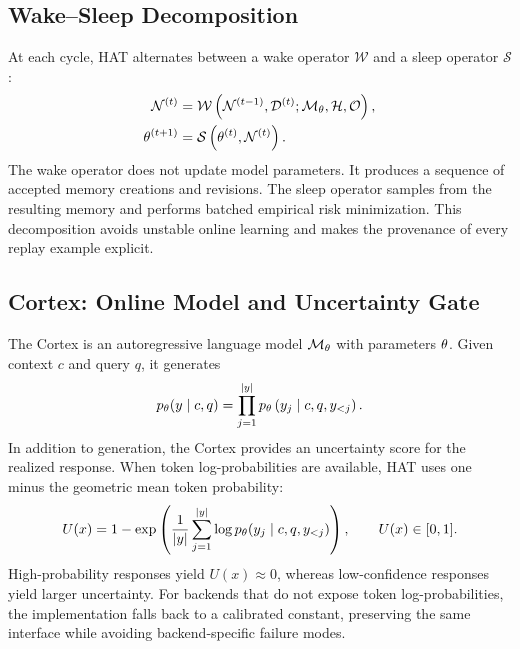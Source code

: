 \subsection{Wake--Sleep Decomposition}
\label{sec:method:wake_sleep}

At each cycle, HAT alternates between a wake operator $\mathcal{W}$ and a sleep operator $\mathcal{S}$:
\begin{align}
  \mathcal{N}^{(t)}
  &=
  \mathcal{W}
  \left(
    \mathcal{N}^{(t-1)}, \mathcal{D}^{(t)}; \mathcal{M}_{\theta}, \mathcal{H}, \mathcal{O}
  \right),
  \label{eq:wake_operator} \\
  \theta^{(t+1)}
  &=
  \mathcal{S}
  \left(
    \theta^{(t)}, \mathcal{N}^{(t)}
  \right).
  \label{eq:sleep_operator}
\end{align}
The wake operator does not update model parameters.
It produces a sequence of accepted memory creations and revisions.
The sleep operator samples from the resulting memory and performs batched empirical risk minimization.
This decomposition avoids unstable online learning and makes the provenance of every replay example explicit.

\subsection{Cortex: Online Model and Uncertainty Gate}
\label{sec:method:cortex}

The Cortex is an autoregressive language model $\mathcal{M}_{\theta}$ with parameters $\theta$.
Given context $c$ and query $q$, it generates
\begin{equation}
  p_{\theta}(y \mid c,q)
  =
  \prod_{j=1}^{|y|}
  p_{\theta}
  \left(y_j \mid c,q,y_{<j}\right).
  \label{eq:cortex_lm}
\end{equation}
In addition to generation, the Cortex provides an uncertainty score for the realized response.
When token log-probabilities are available, HAT uses one minus the geometric mean token probability:
\begin{equation}
  U(x)
  =
  1 -
  \exp
  \left(
    \frac{1}{|y|}
    \sum_{j=1}^{|y|}
    \log p_{\theta}(y_j \mid c,q,y_{<j})
  \right),
  \qquad U(x)\in[0,1].
  \label{eq:logprob_uncertainty}
\end{equation}
High-probability responses yield $U(x)\approx 0$, whereas low-confidence responses yield larger uncertainty.
For backends that do not expose token log-probabilities, the implementation falls back to a calibrated constant, preserving the same interface while avoiding backend-specific failure modes.

